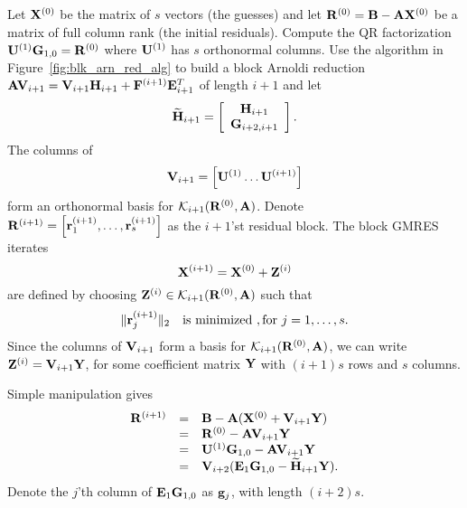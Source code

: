 \documentclass[twoside]{siamltex}
\newcommand{\bA}{{\bf A}}
\newcommand{\bB}{{\bf B}}
\newcommand{\bE}{{\bf E}}
\newcommand{\bF}{{\bf F}}
\newcommand{\bG}{{\bf G}}
\newcommand{\bH}{{\bf H}}
\newcommand{\bV}{{\bf V}}
\newcommand{\bZ}{{\bf Z}}
\newcommand{\bU}{{\bf U}}
\newcommand{\bR}{{\bf R}}
\newcommand{\bX}{{\bf X}}
\newcommand{\bY}{{\bf Y}}
\newcommand{\br}{{\bf r}}
\newcommand{\dm}{\begin{displaymath}}
\newcommand{\edm}{\end{displaymath}}
\newcommand{\eq}{\begin{equation}}
\newcommand{\eeq}{\end{equation}}
\begin{document}
Let $\bX^{(0)}$ be the matrix of $s$ vectors (the guesses) and let
$\bR^{(0)} = \bB - \bA \bX^{(0)}$ be a matrix of full column rank
(the initial residuals). Compute the QR factorization $\bU^{(1)}
\bG_{1,0} = \bR^{(0)}$ where $\bU^{(1)}$ has $s$ orthonormal
columns. Use the algorithm in Figure~\ref{fig:blk_arn_red_alg} to
build a block Arnoldi reduction $\bA \bV_{i+1} = \bV_{i+1}
\bH_{i+1} + \bF^{(i+1)} \bE^T_{i+1}$ of length $i+1$ and let
 \dm
 \widetilde{\bH}_{i+1} =
 \left[
 \begin{array}{c}
                            \bH_{i+1} \\
                            \bG_{i+2,i+1} \end{array} \right].
 \edm
The columns of
 \dm
 \bV_{i+1} = \left[ \bU^{(1)} \ldots \bU^{(i+1)} \right]
 \edm
form an orthonormal basis for ${\cal K}_{i+1}(\bR^{(0)}, \bA)$.
Denote $\bR^{(i+1)} = \left[ \br_1^{(i+1)}, \ldots, \br_s^{(i+1)}
\right]$ as the $i+1$'st residual block. The block GMRES iterates
 \dm
 \bX^{(i+1)} = \bX^{(0)} + \bZ^{(i)}
 \edm
are defined by choosing $\bZ^{(i)} \in {\cal K}_{i+1}(\bR^{(0)},
\bA)$ such that
 \eq
 \|\br_j^{(i+1)}\|_2 ~~~{\rm
 is~minimized}~, {\rm for}~ j = 1,\ldots, s.
 \label{eq:gmresmin}
 \eeq
Since the columns of $\bV_{i+1}$ form a basis for ${\cal
K}_{i+1}(\bR^{(0)}, \bA)$, we can write $\bZ^{(i)} = \bV_{i+1}
\bY$, for some coefficient matrix $\bY$ with $(i+1)s$ rows and $s$
columns.

Simple manipulation gives
 \eq
 \begin{array}{rcl}
 \bR^{(i+1)} & = & \bB - \bA( \bX^{(0)} + \bV_{i+1} \bY) \\
      & = & \bR^{(0)} -  \bA \bV_{i+1} \bY \\
      & = & \bU^{(1)} \bG_{1,0} - \bA \bV_{i+1} \bY \\
      & = & \bV_{i+2}(\bE_1 \bG_{1,0} - \widetilde{\bH}_{i+1} \bY).
 \end{array} \label{eq:gmresresids}
 \eeq
Denote the $j$'th column of $\bE_1 \bG_{1,0}$ as ${\bf g}_j$, with
length $(i+2)s$.
\end{document}
